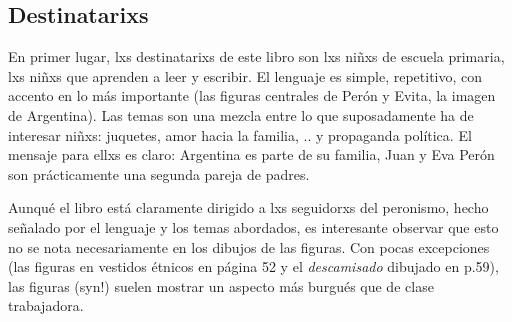 \subsection{Destinatarixs}

En primer lugar, lxs destinatarixs de este libro son lxs niñxs de escuela primaria, lxs niñxs que aprenden a leer y escribir.
El lenguaje es simple, repetitivo, con accento en lo más importante (las figuras centrales de Perón y Evita, la imagen de Argentina).
Las temas son una mezcla entre lo que suposadamente ha de interesar niñxs: juquetes, amor hacia la familia, .. y propaganda política.
El mensaje para ellxs es claro: Argentina es parte de su familia, Juan y Eva Perón son prácticamente una segunda pareja de padres.

Aunqué el libro está claramente dirigido a lxs seguidorxs del peronismo,
hecho señalado por el lenguaje y los temas abordados,
es interesante observar que esto no se nota necesariamente en los dibujos de las figuras.
Con pocas excepciones (las figuras en vestidos étnicos en página 52 y el \textit{descamisado} dibujado en p.59),
las figuras (syn!) suelen mostrar un aspecto más burgués que de clase trabajadora.


\begin{comment}

* "Policlínico Evita" (p.43), "Fundación Eva Perón"(p.43), "clubes infantiles Evita" (donde se practica futbol^^)(p.55)
* se rescatan los éxitos (el voto femenino, el pago de las deudas, p.72...)

* p.10: oraciones, rezar, catolicismo; pero también aquí "nunca olvido a Eva Perón, nuestra Madre Espiritual"
  * gottesgleichheit (hat anscheinend die kirche etwas verstoert^^ -- Chamosa o FF?)
  * kann alle wuensche verwirklichen
\end{comment}
